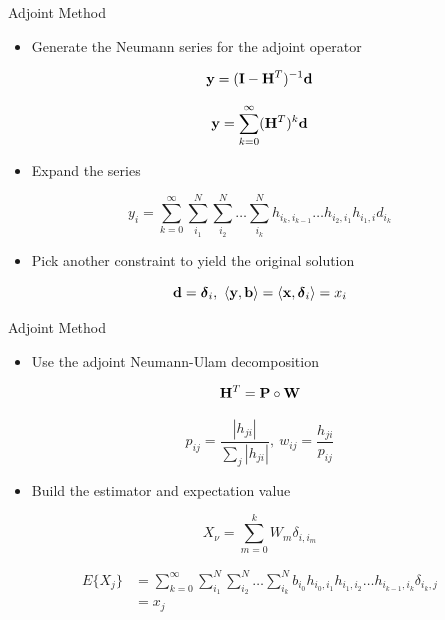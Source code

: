 \documentclass{beamer}
\begin{document}
\begin{frame}{Adjoint Method}

  \begin{itemize}
  \item Generate the Neumann series for the adjoint operator
  \end{itemize}

  \[
  \mathbf{y} = (\mathbf{I} - \mathbf{H}^T)^{-1} \mathbf{d}
  \]

  \[
  \mathbf{y} = \sum_{k=0}^{\infty} (\mathbf{H}^T)^k\mathbf{d}
  \]

  \begin{itemize}
  \item Expand the series
  \end{itemize}

  \[
  y_i = \sum_{k=0}^{\infty}\sum_{i_1}^{N}\sum_{i_2}^{N}\ldots
  \sum_{i_k}^{N}h_{i_k,i_{k-1}}\ldots h_{i_2,i_1} h_{i_1,i} d_{i_k}
  \]

  \begin{itemize}
  \item Pick another constraint to yield the original solution
  \end{itemize}

  \[
  \mathbf{d} = \boldsymbol{\delta}_i,\ \langle \mathbf{y}, \mathbf{b} \rangle =
  \langle \mathbf{x}, \boldsymbol{\delta}_i \rangle = x_i
  \]
  
\end{frame}

\begin{frame}{Adjoint Method}

  \begin{itemize}
  \item Use the adjoint Neumann-Ulam decomposition
  \end{itemize}

  \[
  \mathbf{H}^{T} = \mathbf{P} \circ \mathbf{W}
  \]

  \[
  p_{ij} = \frac{|h_{ji}|}{\sum_j |h_{ji}|},\ w_{ij} =
  \frac{h_{ji}}{p_{ij}}
  \]

  \begin{itemize}
  \item Build the estimator and expectation value
  \end{itemize}

  \[
  X_{\nu} = \sum_{m=0}^k W_{m} \delta_{i,i_m}
  \]

  \[
  \begin{split}
    E\{X_j\} &=\sum_{k=0}^{\infty}\sum_{i_1}^{N}\sum_{i_2}^{N}\ldots
    \sum_{i_k}^{N} b_{i_0} h_{i_0,i_1}h_{i_1,i_2}\ldots h_{i_{k-1},i_k}
    \delta_{i_k,j} \\ &= x_{j}
  \end{split}
  \]

\end{frame}
\end{document}
